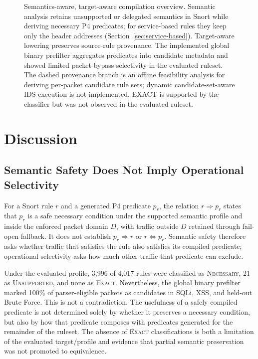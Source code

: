 \documentclass{article}
\begin{document}
\begin{figure}[t]
\caption{Semantics-aware, target-aware compilation overview. Semantic analysis
retains unsupported or delegated semantics in Snort while deriving necessary
P4 predicates; for service-based rules they keep only the header addresses
(Section~\ref{sec:service-based}). Target-aware lowering preserves source-rule
provenance. The implemented global binary prefilter aggregates predicates into
candidate metadata and showed limited packet-bypass selectivity in the
evaluated ruleset. The dashed provenance branch is an offline feasibility
analysis for deriving per-packet candidate rule sets; dynamic
candidate-set-aware IDS execution is not implemented. EXACT is supported by
the classifier but was not observed in the evaluated ruleset.}
\label{fig:semantic-compilation-overview}
\end{figure}

\FloatBarrier
\section{Discussion}
\subsection{Semantic Safety Does Not Imply Operational Selectivity}
For a Snort rule $r$ and a generated P4 predicate $p_r$, the relation
$r \Rightarrow p_r$ states that $p_r$ is a safe necessary condition under the
supported semantic profile and inside the enforced packet domain $D$, with
traffic outside $D$ retained through fail-open fallback. It does not
establish $p_r \Rightarrow r$ or
$r \Leftrightarrow p_r$. Semantic safety therefore asks whether traffic that
satisfies the rule also satisfies its compiled predicate; operational
selectivity asks how much other traffic that predicate can exclude.

Under the evaluated profile, 3,996 of 4,017 rules were classified as
\textsc{Necessary}, 21 as \textsc{Unsupported}, and none as \textsc{Exact}.
Nevertheless, the global binary prefilter marked 100\% of parser-eligible
packets as candidates in SQLi, XSS, and held-out Brute Force. This is not a
contradiction. The usefulness of a safely compiled predicate is not
determined solely by whether it preserves a necessary condition, but also by
how that predicate composes with predicates generated for the remainder of
the ruleset. The absence of \textsc{Exact} classifications is both a
limitation of the evaluated target/profile and evidence that partial
semantic preservation was not promoted to equivalence.
\end{document}

